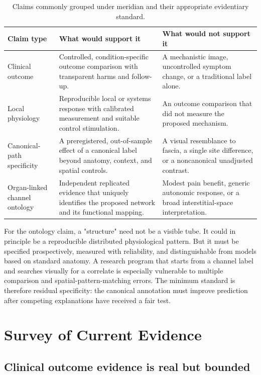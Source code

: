 \documentclass[conference]{IEEEtran}
\begin{document}
\begin{table}[!t]
\caption{Claims commonly grouped under meridian and their appropriate evidentiary standard.}
\label{tab:claims}
\centering
\footnotesize
\begin{tabular}{p{}|p{}|p{}}
\hline
\textbf{Claim type} & \textbf{What would support it} & \textbf{What would not support it} \\
\hline
Clinical outcome & Controlled, condition-specific outcome comparison with transparent harms and follow-up. & A mechanistic image, uncontrolled symptom change, or a traditional label alone. \\
\hline
Local physiology & Reproducible local or systems response with calibrated measurement and suitable control stimulation. & An outcome comparison that did not measure the proposed mechanism. \\
\hline
Canonical-path specificity & A preregistered, out-of-sample effect of a canonical label beyond anatomy, context, and spatial controls. & A visual resemblance to fascia, a single site difference, or a noncanonical unadjusted contrast. \\
\hline
Organ-linked channel ontology & Independent replicated evidence that uniquely identifies the proposed network and its functional mapping. & Modest pain benefit, generic autonomic response, or a broad interstitial-space interpretation. \\
\hline
\end{tabular}
\end{table}

For the ontology claim, a "structure" need not be a visible tube. It could in principle be a reproducible distributed physiological pattern. But it must be specified prospectively, measured with reliability, and distinguishable from models based on standard anatomy. A research program that starts from a channel label and searches visually for a correlate is especially vulnerable to multiple comparison and spatial-pattern-matching errors. The minimum standard is therefore residual specificity: the canonical annotation must improve prediction after competing explanations have received a fair test.

\section{Survey of Current Evidence}

\subsection{Clinical outcome evidence is real but bounded}
\end{document}

